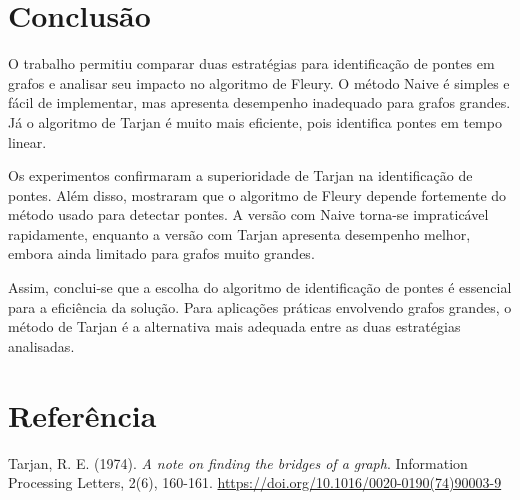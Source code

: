 \documentclass[a4paper,12pt]{article}
\begin{document}
\section{Conclusão}

O trabalho permitiu comparar duas estratégias para identificação de pontes em grafos e analisar seu impacto no algoritmo de Fleury. O método Naive é simples e fácil de implementar, mas apresenta desempenho inadequado para grafos grandes. Já o algoritmo de Tarjan é muito mais eficiente, pois identifica pontes em tempo linear.

Os experimentos confirmaram a superioridade de Tarjan na identificação de pontes. Além disso, mostraram que o algoritmo de Fleury depende fortemente do método usado para detectar pontes. A versão com Naive torna-se impraticável rapidamente, enquanto a versão com Tarjan apresenta desempenho melhor, embora ainda limitado para grafos muito grandes.

Assim, conclui-se que a escolha do algoritmo de identificação de pontes é essencial para a eficiência da solução. Para aplicações práticas envolvendo grafos grandes, o método de Tarjan é a alternativa mais adequada entre as duas estratégias analisadas.

\section{Referência}

Tarjan, R. E. (1974). \textit{A note on finding the bridges of a graph}. Information Processing Letters, 2(6), 160-161. \url{https://doi.org/10.1016/0020-0190(74)90003-9}
\end{document}

